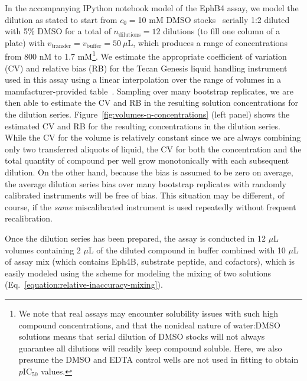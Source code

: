\documentclass[aps,pre,twocolumn,nofootinbib,superscriptaddress,linenumbers]{revtex4-1}
\begin{document}
In the accompanying IPython notebook model of the EphB4 assay, we model the dilution as stated to start from $c_0 = $10 mM DMSO stocks~\cite{barlaam_novel_2009,barlaam_pyrimidine_2010} serially 1:2 diluted with 5\% DMSO for a total of $n_\mathrm{dilutions} = 12$ dilutions (to fill one column of a plate) with $v_\mathrm{transfer} = v_\mathrm{buffer} = 50 \: \mu\mathrm{L}$, which produces a range of concentrations from 800 nM to 1.7 mM\footnote{We note that real assays may encounter solubility issues with such high compound concentrations, and that the nonideal nature of water:DMSO solutions means that serial dilution of DMSO stocks will not always guarantee all dilutions will readily keep compound soluble.  Here, we also presume the DMSO and EDTA control wells are not used in fitting to obtain $p$IC$_{50}$ values.}.
We estimate the appropriate coefficient of variation (CV) and relative bias (RB) for the Tecan Genesis liquid handling instrument used in this assay using a linear interpolation over the range of volumes in a manufacturer-provided table~\cite{_tecan_2001}.
Sampling over many bootstrap replicates, we are then able to estimate the CV and RB in the resulting solution concentrations for the dilution series.
Figure~\ref{fig:volumes-n-concentrations} (left panel) shows the estimated CV and RB for the resulting concentrations in the dilution series.
While the CV for the volume is relatively constant since we are always combining only two transferred aliquots of liquid, the CV for both the concentration and the total quantity of compound per well grow monotonically with each subsequent dilution.
On the other hand, because the bias is assumed to be zero on average, the average dilution series bias over many bootstrap replicates with randomly calibrated instruments will be free of bias.
This situation may be different, of course, if the \emph{same} miscalibrated instrument is used repeatedly without frequent recalibration.

Once the dilution series has been prepared, the assay is conducted in 12 $\mu$L volumes containing 2 $\mu$L of the diluted compound in buffer combined with 10 $\mu$L of assay mix (which contains Eph4B, substrate peptide, and cofactors), which is easily modeled using the scheme for modeling the mixing of two solutions (Eq.~\ref{equation:relative-inaccuracy-mixing}).

\end{document}
